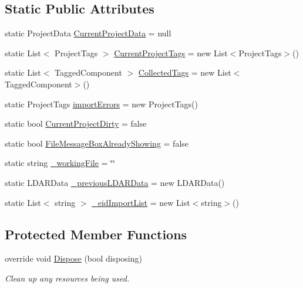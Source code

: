 \subsection*{Static Public Attributes}
\begin{DoxyCompactItemize}
\item 
static Project\+Data \hyperlink{class_env_int_1_1_win32_1_1_field_tech_1_1_manager_1_1_main_form_a00fee53ce3555bc5b1f2b6fd9ec0261e}{Current\+Project\+Data} = null
\item 
static List$<$ Project\+Tags $>$ \hyperlink{class_env_int_1_1_win32_1_1_field_tech_1_1_manager_1_1_main_form_a5f2e0bd0e4ff55c4b48eabe465e6bdd7}{Current\+Project\+Tags} = new List$<$Project\+Tags$>$()
\item 
static List$<$ Tagged\+Component $>$ \hyperlink{class_env_int_1_1_win32_1_1_field_tech_1_1_manager_1_1_main_form_ad2b2abd23a36163cd85036c383d14166}{Collected\+Tags} = new List$<$Tagged\+Component$>$()
\item 
static Project\+Tags \hyperlink{class_env_int_1_1_win32_1_1_field_tech_1_1_manager_1_1_main_form_a818352b5631b266edda57799ab3dad42}{import\+Errors} = new Project\+Tags()
\item 
static bool \hyperlink{class_env_int_1_1_win32_1_1_field_tech_1_1_manager_1_1_main_form_a696c45fa8a7c89fed82136d1d4d27470}{Current\+Project\+Dirty} = false
\item 
static bool \hyperlink{class_env_int_1_1_win32_1_1_field_tech_1_1_manager_1_1_main_form_a7dbf57f63255d8251f75d8f6f9cfdffc}{File\+Message\+Box\+Already\+Showing} = false
\item 
static string \hyperlink{class_env_int_1_1_win32_1_1_field_tech_1_1_manager_1_1_main_form_a1daf7b2c6996fc0330b00d8a30116b34}{\+\_\+working\+File} = \char`\"{}\char`\"{}
\item 
static L\+D\+A\+R\+Data \hyperlink{class_env_int_1_1_win32_1_1_field_tech_1_1_manager_1_1_main_form_a5028af3b0977c646c45503d9ff37dbd0}{\+\_\+previous\+L\+D\+A\+R\+Data} = new L\+D\+A\+R\+Data()
\item 
static List$<$ string $>$ \hyperlink{class_env_int_1_1_win32_1_1_field_tech_1_1_manager_1_1_main_form_a21a074faa0f2ed6863a5fecc6dec3391}{\+\_\+eid\+Import\+List} = new List$<$string$>$()
\end{DoxyCompactItemize}
\subsection*{Protected Member Functions}
\begin{DoxyCompactItemize}
\item 
override void \hyperlink{class_env_int_1_1_win32_1_1_field_tech_1_1_manager_1_1_main_form_aecc8ce2c7abb5ca017029d0c922cb86d}{Dispose} (bool disposing)
\begin{DoxyCompactList}\small\item\em Clean up any resources being used. \end{DoxyCompactList}\end{DoxyCompactItemize}


